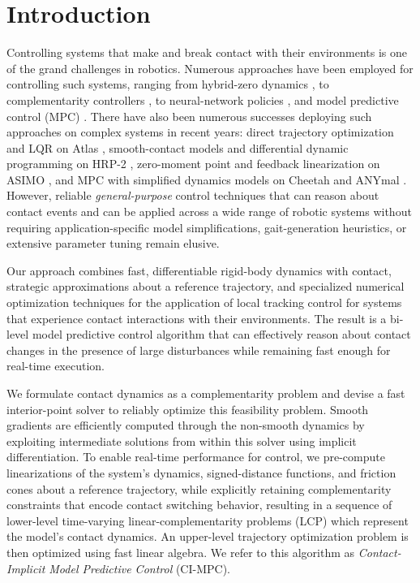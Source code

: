 \section{Introduction} \label{cipc_introduction}
Controlling systems that make and break contact with their environments is one of the grand challenges in robotics. Numerous approaches have been employed for controlling such systems, ranging from hybrid-zero dynamics \cite{westervelt2003hybrid, ames2014rapidly, li2021reinforcement}, to complementarity controllers \cite{aydinoglu2020contact}, to neural-network policies \cite{heess2017emergence,heiden2020neuralsim}, and model predictive control (MPC) \cite{winkler2018gait, sleiman2021unified}. There have also been numerous successes deploying such approaches on complex systems in recent years: direct trajectory optimization and LQR on Atlas \cite{kuindersma2016optimization}, smooth-contact models and differential dynamic programming on HRP-2  \cite{todorov2012mujoco, tassa2012synthesis, koenemann2015whole}, zero-moment point and feedback linearization on ASIMO \cite{hirai1998development}, and MPC with simplified dynamics models on Cheetah \cite{bledt2020regularized} and ANYmal \cite{lee2020learning}. However, reliable \emph{general-purpose} control techniques that can reason about contact events and can be applied across a wide range of robotic systems without requiring application-specific model simplifications, gait-generation heuristics, or extensive parameter tuning remain elusive.

Our approach combines fast, differentiable rigid-body dynamics with contact, strategic approximations about a reference trajectory, and specialized numerical optimization techniques for the application of local tracking control for systems that experience contact interactions with their environments. The result is a bi-level model predictive control algorithm that can effectively reason about contact changes in the presence of large disturbances while remaining fast enough for real-time execution.

We formulate contact dynamics as a complementarity problem and devise a fast interior-point solver to reliably optimize this feasibility problem. Smooth gradients are efficiently computed through the non-smooth dynamics by exploiting intermediate solutions from within this solver using implicit differentiation. To enable real-time performance for control, we pre-compute linearizations of the system's dynamics, signed-distance functions, and friction cones about a reference trajectory, while explicitly retaining complementarity constraints that encode contact switching behavior, resulting in a sequence of lower-level time-varying linear-complementarity problems (LCP) which represent the model's contact dynamics. An upper-level trajectory optimization problem is then optimized using fast linear algebra. We refer to this algorithm as \textit{Contact-Implicit Model Predictive Control} (CI-MPC).

